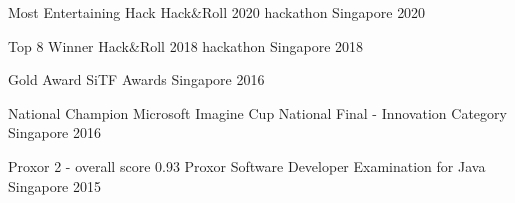 



\begin{cvawards}

  \cvaward
    {Most Entertaining Hack} %
    {Hack\&Roll 2020 hackathon} %
    {Singapore} %
    {2020} %

  \cvaward
    {Top 8 Winner} %
    {Hack\&Roll 2018 hackathon} %
    {Singapore} %
    {2018} %

  \cvaward
    {Gold Award} %
    {SiTF Awards} %
    {Singapore} %
    {2016} %

  \cvaward
    {National Champion} %
    {Microsoft Imagine Cup National Final - Innovation Category} %
    {Singapore} %
    {2016} %

  \cvaward
    {Proxor 2 - overall score 0.93} %
    {Proxor Software Developer Examination for Java} %
    {Singapore} %
    {2015} %

\end{cvawards}
